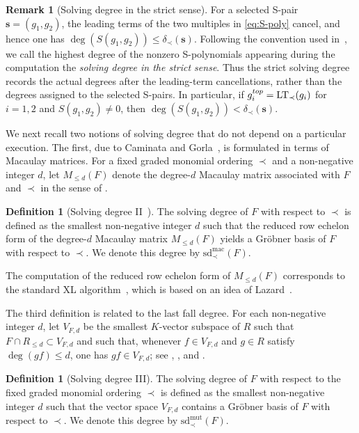\documentclass{article}
\theoremstyle{definition}
\newtheorem{definition}[theorem]{Definition}
\newtheorem{remark}[theorem]{Remark}
\theoremstyle{plain}
\theoremstyle{plain}
\theoremstyle{plain}
\theoremstyle{plain}
\numberwithin{equation}{subsection}
\begin{document}
\begin{remark}[Solving degree in the strict sense]\label{rem:solvedeg1_str}
For a selected S-pair $\bm s=(g_1,g_2)$, the leading terms of the two multiples in \eqref{eq:S-poly} cancel, and hence one has $\deg (S(g_1,g_2))\leq\delta_\prec(\bm s)$.
Following the convention used in~\cite{Tenti,ST}, we call the highest
degree of the nonzero S-polynomials appearing during the computation the \emph{solving degree in the strict sense}.
Thus the strict solving degree records the actual degrees after the leading-term cancellations, rather than the degrees assigned to the selected S-pairs.
In particular, if $g_i^{\rm top}=\operatorname{LT}_\prec(g_i)$ for $i=1,2$ and $S(g_1,g_2)\neq0$, then $\deg (S(g_1,g_2))<\delta_\prec(\bm s)$.
\end{remark}

We next recall two notions of solving degree that do not depend on a particular execution.
The first, due to Caminata and Gorla~\cite{CG20}, is formulated in terms of Macaulay matrices.
For a fixed graded monomial ordering $\prec$ and a non-negative integer $d$, let $M_{\le d}(F)$ denote the degree-$d$ Macaulay matrix associated with $F$ and $\prec$ in the sense of \cite[Section~3]{CG20}.

\begin{definition}[Solving degree II~\cite{CG20}]\label{def:solvedeg2}
The solving degree of $F$ with respect to $\prec$ is defined as the smallest non-negative integer $d$ such that the reduced row echelon form of the degree-$d$ Macaulay matrix $M_{\le d}(F)$ yields a Gr\"obner basis of $F$ with respect to $\prec$.
We denote this degree by $\mathrm{sd}_{\prec}^{\mathrm{mac}}(F)$.
\end{definition}

The computation of the reduced row echelon form of $M_{\le d}(F)$ corresponds to the standard XL algorithm~\cite{XL}, which is based on an idea of Lazard~\cite{Lazard}.

The third definition is related to the last fall degree.
For each non-negative integer $d$, let $V_{F,d}$ be the smallest $K$-vector subspace of $R$ such that $F\cap R_{\leq d}\subset V_{F,d}$ and such that, whenever $f\in V_{F,d}$ and $g\in R$ satisfy $\deg(gf)\leq d$, one has $gf\in V_{F,d}$;
see \cite[Definition~1]{LFD2015}, \cite[Definition~2.1]{LFD2018}, and \cite[Definition~1.5]{CG23}.

\begin{definition}[Solving degree III]\label{def:solvedeg3}
The solving degree of $F$ with respect to the fixed graded monomial ordering $\prec$ is defined as the smallest non-negative integer $d$ such that the vector space $V_{F,d}$ contains a Gr\"obner basis of $F$ with respect to $\prec$.
We denote this degree by $\mathrm{sd}_{\prec}^{\mathrm{mut}}(F)$.
\end{definition}
\end{document}
